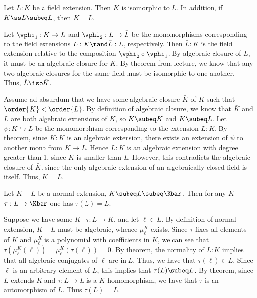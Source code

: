 \documentclass{article}
\begin{document}
\begin{exercise} %
  Let \( L:K \) be a field extension. Then \( \bar K \) is isomorphic to \( \bar L \).
  In addition, if \( K\ss L \subeq \bar L \), then \( \bar K = \bar L \).
\end{exercise}
\begin{solution}
  Let \( \vphi_1:K\to L \) and \( \vphi_2:L\to \bar L \) be the monomorphisms corresponding to the field extensions \( L:K \tand \bar L:L \), respectively.
  Then \( \bar L:K \) is the field extension relative to the composition \( \vphi_2\circ \vphi_1 \).
  By algebraic closure of \( \bar L \), it must be an algebraic closure for \( K \).
  By theorem from lecture, we know that any two algebraic closures for the same field must be isomorphic to one another.
  Thus, \( \bar L\iso \bar K \).

  Assume ad absurdum that we have some algebraic closure \( \bar K \) of \( K \) such that \( \order{\bar K} < \order{\bar L} \).
  By definition of algebraic closure, we know that \( \bar K \) and \( \bar L \) are both algebraic extensions of \( K \), so \( K\subeq \bar K \) and \( K\subeq \bar L \).
  Let \( \psi:K\hookrightarrow\bar L \) be the monomorphism corresponding to the extension \( \bar L:K \).
  By theorem, since \( \bar K:K \) is an algebraic extension, there exists an extension of \( \psi \) to another mono from \( \bar K \to \bar L \).
  Hence \( \bar L:\bar K \) is an algebraic extension with degree greater than 1, since \( \bar K \) is smaller than \( \bar L \).
  However, this contradicts the algebraic closure of \( \bar K \), since the only algebraic extension of an algebraically closed field is itself.
  Thus, \( \bar K = \bar L \).
\end{solution}

\begin{exercise} %
  Let \( K-L \) be a normal extension, \( K\subeq L\subeq \Kbar \).
  Then for any \( K \)-\homo~\( \tau:L\to \Kbar \) one has \( \tau(L) = L \).
\end{exercise}
\begin{solution}
  Suppose we have some \( K \)-\homo~\( \tau:L\to\bar K \), and let \( \ell\in L \).
  By definition of normal extension, \( K-L \) must be algebraic, whence \( \mu_\ell^K \) exists.
  Since \( \tau \) fixes all elements of \( K \) and \( \mu_\ell^K \) is a polynomial with coefficients in \( K \), we can see that \( \tau(\mu_\ell^K(\ell)) = \mu_\ell^K(\tau(\ell)) = 0 \).
  By theorem, the normality of \( L:K \) implies that all algebraic conjugates of \( \ell \) are in \( L \).
  Thus, we have that \( \tau(\ell)\in L \).
  Since \( \ell \) is an arbitrary element of \( L \), this implies that \( \tau(L) \subeq L \).
  By theorem, since \( L \) extends \( K \) and \( \tau:L\to L \) is a \( K \)-homomorphism, we have that \( \tau \) is an automorphism of \( L \).
  Thus \( \tau(L) = L \).
\end{solution}
\end{document}
